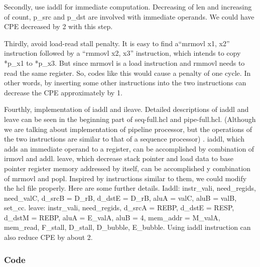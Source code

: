\documentclass{article}
\begin{document}
	   \par Secondly, use iaddl for immediate computation. Decreasing of len and increasing of count, p\_src and p\_dst are involved with immediate operands. We could have CPE decreased by 2 with this step.
	   \par Thirdly, avoid load-read stall penalty. It is easy to find a“mrmovl x1, x2” instruction followed by a “rmmovl x2, x3” instruction, which intends to copy *p\_x1 to *p\_x3. But since mrmovl is a load instruction and rmmovl needs to read the same register. So, codes like this would cause a penalty of one cycle. In other words, by inserting some other instructions into the two instructions can decrease the CPE approximately by 1.
	   \par Fourthly, implementation of iaddl and ileave. Detailed descriptions of iaddl and leave can be seen in the beginning part of seq-full.hcl and pipe-full.hcl. (Although we are talking about implementation of pipeline processor, but the operations of the two instructions are similar to that of a sequence processor) . iaddl, which adds an immediate operand to a register, can be accomplished by combination of irmovl and addl. leave, which decrease stack pointer and load data to base pointer register memory addressed by itself, can be accomplished y combination of mrmovl and popl. Inspired by instructions similar to them, we could modify the hcl file properly. Here are some further details. Iaddl: instr\_vali, need\_regids, need\_valC, d\_srcB = D\_rB, d\_dstE = D\_rB, aluA = valC, aluB = valB, set\_cc. leave: instr\_vali, need\_regids, d\_srcA = REBP, d\_dstE = RESP, d\_dstM = REBP, aluA = E\_valA, aluB = 4, mem\_addr = M\_valA, mem\_read, F\_stall, D\_stall, D\_bubble, E\_bubble. Using iaddl instruction can also reduce CPE by about 2.\\


\subsubsection{Code}
\end{document}
